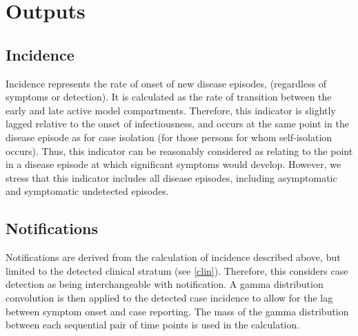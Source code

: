 \section{Outputs}

\subsection{Incidence}
Incidence represents the rate of onset of new disease episodes,
(regardless of symptoms or detection).
It is calculated as the rate of transition between the early and late active model compartments.
Therefore, this indicator is slightly lagged relative to the onset of infectiousness,
and occurs at the same point in the disease episode as for case isolation
(for those persons for whom self-isolation occurs).
Thus, this indicator can be reasonably considered as relating to the point in a disease episode
at which significant symptoms would develop.
However, we stress that this indicator includes all disease episodes,
including asymptomatic and symptomatic undetected episodes.

\subsection{Notifications}
Notifications are derived from the calculation of incidence described above,
but limited to the detected clinical stratum (see \ref{clin}).
Therefore, this considers case detection as being interchangeable with notification.
A gamma distribution convolution is then applied to the detected case incidence to allow for the lag
between symptom onset and case reporting.  %
The mass of the gamma distribution between each sequential pair of time points is
used in the calculation.

